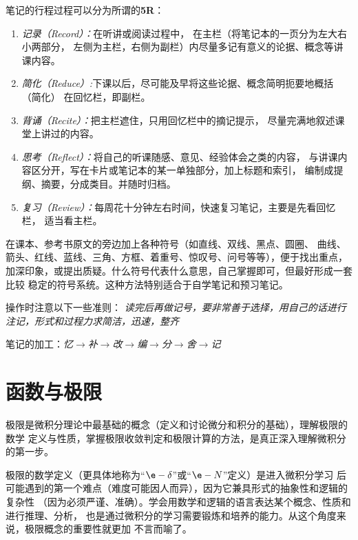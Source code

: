 \begin{shaded}
	笔记的行程过程可以分为所谓的{\bf 5R}：
	
	\begin{enumerate}[Step1]
	  \setlength{\itemindent}{1cm}
	  \item {\it 记录（Record）：}在听讲或阅读过程中，
	  在主栏（将笔记本的一页分为左大右小两部分，
	  左侧为主栏，右侧为副栏）内尽量多记有意义的论据、概念等讲课内容。
	  \item {\it 简化（Reduce）:}下课以后，尽可能及早将这些论据、概念简明扼要地概括（简化）
	  在回忆栏，即副栏。
	  \item {\it 背诵（Recite）：}把主栏遮住，只用回忆栏中的摘记提示，
	  尽量完满地叙述课堂上讲过的内容。
	  \item {\it 思考（Reflect）：}将自己的听课随感、意见、经验体会之类的内容，
	  与讲课内容区分开，写在卡片或笔记本的某一单独部分，加上标题和索引，
	  编制成提纲、摘要，分成类目。并随时归档。
	  \item {\it 复习（Review）：}每周花十分钟左右时间，快速复习笔记，主要是先看回忆栏，
	  适当看主栏。
	\end{enumerate}
	
	在课本、参考书原文的旁边加上各种符号（如直线、双线、黑点、圆圈、
	曲线、箭头、红线、蓝线、三角、方框、着重号、惊叹号、问号等等），便于找出重点，
	加深印象，或提出质疑。什么符号代表什么意思，自己掌握即可，但最好形成一套比较
	稳定的符号系统。这种方法特别适合于自学笔记和预习笔记。
	
	操作时注意以下一些准则：
	{\it 读完后再做记号，要非常善于选择，用自己的话进行注记，形式和过程力求简洁，迅速，整齐}
	
	笔记的加工：{\it 忆$\to$补$\to$改$\to$编$\to$分$\to$舍$\to$记}	
\end{shaded}

\chapter{函数与极限}

极限是微积分理论中最基础的概念（定义和讨论微分和积分的基础），理解极限的数学
定义与性质，掌握极限收敛判定和极限计算的方法，是真正深入理解微积分的第一步。

极限的数学定义（更具体地称为“$\e-\delta$”或“$\e-N$”定义）是进入微积分学习
后可能遇到的第一个难点（难度可能因人而异），因为它兼具形式的抽象性和逻辑的复杂性
（因为必须严谨、准确）。学会用数学和逻辑的语言表达某个概念、性质和进行推理、分析，
也是通过微积分的学习需要锻炼和培养的能力。从这个角度来说，极限概念的重要性就更加
不言而喻了。


